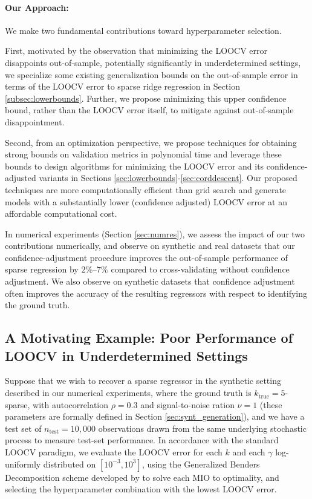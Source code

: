 \documentclass[opre,nonblindrev]{informs3} %
\begin{document}
\paragraph{Our Approach:} We make two fundamental contributions toward hyperparameter selection. 

First, motivated by the observation that minimizing the LOOCV error disappoints out-of-sample, potentially significantly in underdetermined settings, we specialize some existing generalization bounds on the out-of-sample error in terms of the LOOCV error to sparse ridge regression in Section \ref{subsec:lowerbounds}. Further, we propose minimizing this upper confidence bound, rather than the LOOCV error itself, to mitigate against out-of-sample disappointment. 

Second, from an optimization perspective, we propose techniques for obtaining strong bounds on validation metrics in polynomial time and leverage these bounds to design algorithms for minimizing the LOOCV error and its confidence-adjusted variants in Sections \ref{sec:lowerbounds}-\ref{sec:corddescent}. Our proposed techniques are more computationally efficient than grid search and generate models with a substantially lower (confidence adjusted) LOOCV error at an affordable computational cost. 

In numerical experiments (Section \ref{sec:numres}), we assess the impact of our two contributions numerically, and observe on synthetic and real datasets that our confidence-adjustment procedure improves the out-of-sample performance of sparse regression by $2\%$--$7\%$ compared to cross-validating without confidence adjustment. We also observe on synthetic datasets that confidence adjustment often improves the accuracy of the resulting regressors with respect to identifying the ground truth.

\subsection{A Motivating Example: Poor Performance of LOOCV in Underdetermined Settings}\label{sec:intro_motivation}
Suppose that we wish to recover a sparse regressor in the synthetic setting described in our numerical experiments, where the ground truth is $k_{\text{true}}=5$-sparse, with autocorrelation $\rho=0.3$ and signal-to-noise ration $\nu=1$ (these parameters are formally defined in Section \ref{sec:synt_generation}), and we have a test set of $n_{\text{test}}=10,000$ observations drawn from the same underlying stochastic process to measure test-set performance. In accordance with the standard LOOCV paradigm, we evaluate the LOOCV error for each $k$ and each $\gamma$ log-uniformly distributed on $[10^{-3}, 10^3]$, using the Generalized Benders Decomposition scheme developed by \cite{bertsimas2020sparse} to solve each MIO to optimality, and selecting the hyperparameter combination with the lowest LOOCV error. 
\end{document}
